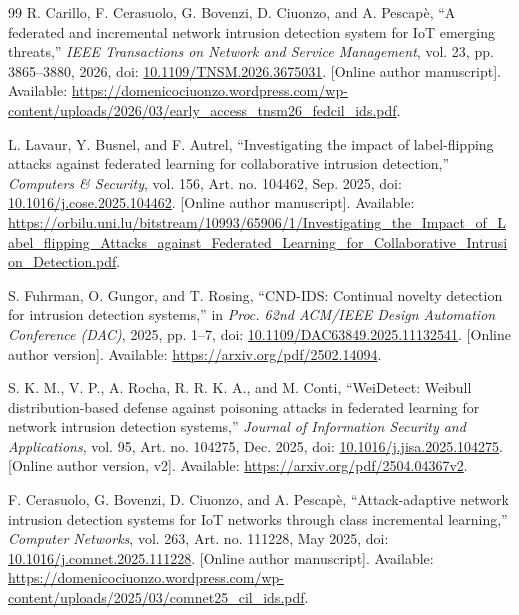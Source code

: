 \documentclass[10pt,a4paper]{article}
\begin{document}
\begin{thebibliography}{99}
R. Carillo, F. Cerasuolo, G. Bovenzi, D. Ciuonzo, and A. Pescap\`e,
``A federated and incremental network intrusion detection system for IoT emerging threats,''
\emph{IEEE Transactions on Network and Service Management}, vol. 23, pp. 3865--3880, 2026,
doi: \href{https://doi.org/10.1109/TNSM.2026.3675031}{10.1109/TNSM.2026.3675031}.
[Online author manuscript]. Available: \url{https://domenicociuonzo.wordpress.com/wp-content/uploads/2026/03/early_access_tnsm26_fedcil_ids.pdf}.

L. Lavaur, Y. Busnel, and F. Autrel,
``Investigating the impact of label-flipping attacks against federated learning for collaborative intrusion detection,''
\emph{Computers \& Security}, vol. 156, Art. no. 104462, Sep. 2025,
doi: \href{https://doi.org/10.1016/j.cose.2025.104462}{10.1016/j.cose.2025.104462}.
[Online author manuscript]. Available: \url{https://orbilu.uni.lu/bitstream/10993/65906/1/Investigating_the_Impact_of_Label_flipping_Attacks_against_Federated_Learning_for_Collaborative_Intrusion_Detection.pdf}.

S. Fuhrman, O. Gungor, and T. Rosing,
``CND-IDS: Continual novelty detection for intrusion detection systems,''
in \emph{Proc. 62nd ACM/IEEE Design Automation Conference (DAC)}, 2025, pp. 1--7,
doi: \href{https://doi.org/10.1109/DAC63849.2025.11132541}{10.1109/DAC63849.2025.11132541}.
[Online author version]. Available: \url{https://arxiv.org/pdf/2502.14094}.

S. K. M., V. P., A. Rocha, R. R. K. A., and M. Conti,
``WeiDetect: Weibull distribution-based defense against poisoning attacks in federated learning for network intrusion detection systems,''
\emph{Journal of Information Security and Applications}, vol. 95, Art. no. 104275, Dec. 2025,
doi: \href{https://doi.org/10.1016/j.jisa.2025.104275}{10.1016/j.jisa.2025.104275}.
[Online author version, v2]. Available: \url{https://arxiv.org/pdf/2504.04367v2}.

F. Cerasuolo, G. Bovenzi, D. Ciuonzo, and A. Pescap\`e,
``Attack-adaptive network intrusion detection systems for IoT networks through class incremental learning,''
\emph{Computer Networks}, vol. 263, Art. no. 111228, May 2025,
doi: \href{https://doi.org/10.1016/j.comnet.2025.111228}{10.1016/j.comnet.2025.111228}.
[Online author manuscript]. Available: \url{https://domenicociuonzo.wordpress.com/wp-content/uploads/2025/03/comnet25_cil_ids.pdf}.


\end{thebibliography}
\end{document}
